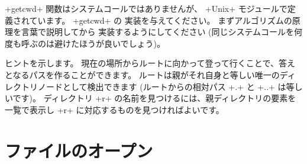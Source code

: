 \begin{exercise}
\ml+getcwd+ 関数はシステムコールではありませんが、 \ml+Unix+ モジュールで定義されています。
\ml+getcwd+ の  実装を与えてください。
まずアルゴリズムの原理を言葉で説明してから
実装するようにしてください (同じシステムコールを何度も呼ぶのは避けたほうが良いでしょう)。
\end{exercise}
\begin{answer}
ヒントを示します。
現在の場所からルートに向かって登って行くことで、答えとなるパスを作ることができます。
ルートは親がそれ自身と等しい唯一のディレクトリノードとして検出できます
(ルートからの相対パス \ml+.+ と \ml+..+ は等しいです)。
ディレクトリ \ml+r+ の名前を見つけるには、親ディレクトリの要素を一覧で表示し
\ml+r+ に対応するものを見つければよいです。
\end{answer}

\section{ファイルのオープン}


